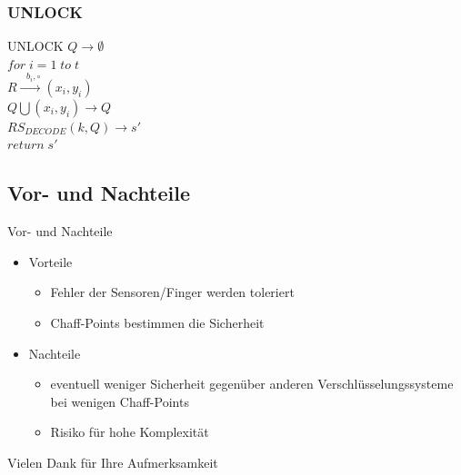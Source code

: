 \documentclass{beamer}
\begin{document}
\subsubsection{UNLOCK}
\begin{frame}{UNLOCK}
	\hspace*{10mm}$ Q \rightarrow \emptyset$ \\[1ex]
	\hspace*{10mm}$for \; i=1 \; to \; t $\\[1ex]
	\hspace*{15mm}$R \xrightarrow{\text{ $b_{i}, \circ $}} (x_{i}, y_{i})$\\[1ex]
	\hspace*{15mm}$Q\bigcup (x_{i},y_{i}) \rightarrow Q$\\[1ex]
	\hspace*{10mm}$RS_{DECODE}(k,Q) \rightarrow s'$\\[1ex]
	\hspace*{10mm}$return\; s' $\\[1ex]
\end{frame}
\subsection{Vor- und Nachteile}
\begin{frame}{Vor- und Nachteile}
\begin{itemize}
		\item Vorteile	\\[1ex]
		\begin{itemize}
			\item Fehler der Sensoren/Finger werden toleriert
			\item Chaff-Points bestimmen die Sicherheit \\[3ex]
		\end{itemize}
		\item Nachteile \\[1ex]
		\begin{itemize}
			\item eventuell weniger Sicherheit gegenüber anderen Verschlüsselungssysteme bei wenigen Chaff-Points
			\item Risiko für hohe Komplexität
		\end{itemize}
	\end{itemize}
\end{frame}
\begin{frame}
\huge{Vielen Dank für Ihre Aufmerksamkeit}
\end{frame}
\end{document}
